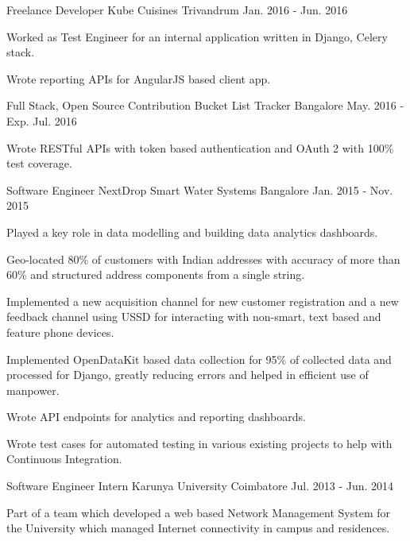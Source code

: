 \begin{cventries}
  \cventry
    {Freelance Developer}
    {Kube Cuisines}
    {Trivandrum}
    {Jan. 2016 - Jun. 2016}
    {
      \begin{cvitems}
        \item {Worked as Test Engineer for an internal application written in Django, Celery stack.}
        \item {Wrote reporting APIs for AngularJS based client app.}
      \end{cvitems}
    }
  \cventry
    {Full Stack, Open Source Contribution}
    {Bucket List Tracker}
    {Bangalore}
    {May. 2016 - Exp. Jul. 2016}
    {
      \begin{cvitems}
        \item {Wrote RESTful APIs with token based authentication and OAuth 2 with 100\% test coverage.}
      \end{cvitems}
    }
  \cventry
    {Software Engineer}
    {NextDrop Smart Water Systems}
    {Bangalore}
    {Jan. 2015 - Nov. 2015}
    {
      \begin{cvitems}
        \item {Played a key role in data modelling and building data analytics dashboards.}
        \item {Geo-located 80\% of customers with Indian addresses with accuracy of more than 60\% and structured address components from a single string.}
        \item {Implemented a new acquisition channel for new customer registration and a new feedback channel using USSD for interacting with non-smart, text based and feature phone devices.}
        \item {Implemented OpenDataKit based data collection for 95\% of collected data and processed for Django, greatly reducing errors and helped in efficient use of manpower.}
        \item {Wrote API endpoints for analytics and reporting dashboards.}
        \item {Wrote test cases for automated testing in various existing projects to help with Continuous Integration.}
      \end{cvitems} 
    }
  \cventry
    {Software Engineer Intern}
    {Karunya University}
    {Coimbatore}
    {Jul. 2013 - Jun. 2014}
    {
      \begin{cvitems}
        \item {Part of a team which developed a web based Network Management System for the University which managed Internet connectivity in campus and residences.}

\end{cvitems}}
\end{cventries}
